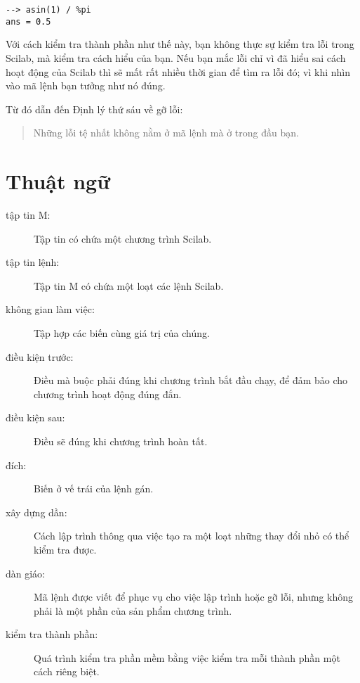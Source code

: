 \documentclass[12pt]{book}
\begin{document}
\begin{verbatim}
--> asin(1) / %pi
ans = 0.5
\end{verbatim}
%
Với cách kiểm tra thành phần như thế này, bạn không thực sự kiểm tra
lỗi trong Scilab, mà kiểm tra cách hiểu của bạn. Nếu bạn mắc lỗi
chỉ vì đã hiểu sai cách hoạt động của Scilab thì sẽ mất rất nhiều
thời gian để tìm ra lỗi đó; vì khi nhìn vào mã lệnh bạn tưởng như
nó đúng.

Từ đó dẫn đến Định lý thứ sáu về gỡ lỗi:

\begin{quote}
Những lỗi tệ nhất không nằm ở mã lệnh mà ở trong đầu bạn.
\end{quote}



\section{Thuật ngữ}

\begin{description}

\item[tập tin M:] Tập tin có chứa một chương trình Scilab.

\item[tập tin lệnh:] Tập tin M có chứa một loạt các lệnh Scilab.


\item[không gian làm việc:] Tập hợp các biến cùng giá trị của chúng.

\item[điều kiện trước:] Điều mà buộc phải đúng khi chương trình bắt đầu
chạy, để đảm bảo cho chương trình hoạt động đúng đắn.

\item[điều kiện sau:] Điều sẽ đúng khi chương trình hoàn tất.

\item[đích:] Biến ở vế trái của lệnh gán.

\item[xây dựng dần:] Cách lập trình thông qua việc tạo ra một
loạt những thay đổi nhỏ có thể kiểm tra được.

\item[dàn giáo:] Mã lệnh được viết để phục vụ cho việc lập trình hoặc
gỡ lỗi, nhưng không phải là một phần của sản phẩm chương trình.

\item[kiểm tra thành phần:] Quá trình kiểm tra phần mềm bằng việc
kiểm tra mỗi thành phần một cách riêng biệt.

\end{description}
\end{document}
